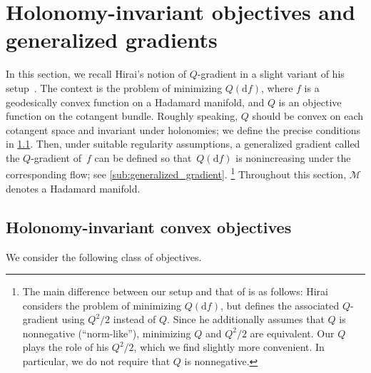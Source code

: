 \documentclass[11pt,letterpaper]{article}
\numberwithin{equation}{section}
\newcommand{\diff}{\mathrm{d}}
\newcommand{\MM}{\mathcal{M}}
\begin{document}
\section{Holonomy-invariant objectives and generalized gradients}\label{sec:generalized-gradients}
In this section, we recall Hirai's notion of $Q$-gradient in a slight variant of his setup~\cite{Hirai2025}.
The context is the problem of minimizing $Q(\diff f)$, where $f$ is a geodesically convex function on a Hadamard manifold, and $Q$ is an objective function on the cotangent bundle.
Roughly speaking, $Q$ should be convex on each cotangent space and invariant under holonomies; we define the precise conditions in \cref{sub:objective}.
Then, under suitable regularity assumptions, a generalized gradient called the $Q$-gradient of~$f$ can be defined so that~$Q(\diff f)$ is nonincreasing under the corresponding flow; see \cref{sub:generalized_gradient}.%
\footnote{\label{footnote:Q}The main difference between our setup and that of \cite{Hirai2025} is as follows:
Hirai considers the problem of minimizing $Q(\diff f)$, but defines the associated $Q$-gradient using $Q^2/2$ instead of $Q$.
Since he additionally assumes that $Q$ is nonnegative (``norm-like''), minimizing $Q$ and $Q^2/2$ are equivalent.
Our $Q$ plays the role of his $Q^2/2$, which we find slightly more convenient.
In particular, we do not require that $Q$ is nonnegative.}
Throughout this section, $\MM$ denotes a Hadamard manifold.

\subsection{Holonomy-invariant convex objectives}\label{sub:objective}
We consider the following class of objectives.
\end{document}
